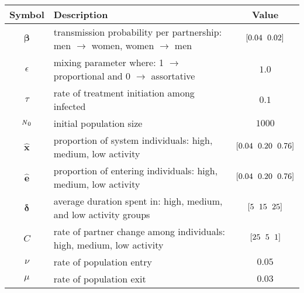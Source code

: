 \begin{tabular}{clc}
	\toprule
	    Symbol     & Description                                                                                             &          Value          \\
	\midrule
	 $\bm{\beta}$  & transmission probability per partnership: men $\rightarrow$ women, women $\rightarrow$ men              &   $\tarr{0.04,0.02}$    \\
	  $\epsilon$   & mixing parameter where: 1 $\rightarrow$ proportional and 0 $\rightarrow$ assortative \cite{Garnett1994} &          $1.0$          \\
	    $\tau$     & rate of treatment initiation among infected                                                             &          $0.1$          \\
	    ${\mbox{\footnotesize{\textit{N}}}}_0$     & initial population size                                                                                 &         $1000$          \\
	\midrule
	$\bm{\hat{x}}$ & proportion of system individuals: high, medium, low activity                                            & $\tarr{0.04,0.20,0.76}$ \\
	$\bm{\hat{e}}$ & proportion of entering individuals: high, medium, low activity                                          & $\tarr{0.04,0.20,0.76}$ \\
	$\bm{\delta}$  & average duration spent in: high, medium, and low activity groups                                        &    $\tarr{5,15,25}$     \\
	     $C$       & rate of partner change among individuals: high, medium, low activity                                    &     $\tarr{25,5,1}$     \\
	    $\nu$      & rate of population entry                                                                                &         $0.05$          \\
	    $\mu$      & rate of population exit                                                                                 &         $0.03$          \\
	\bottomrule
\end{tabular}
